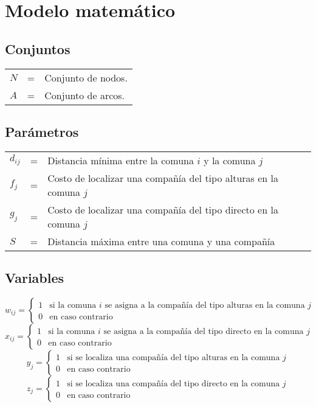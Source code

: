 \documentclass[final]{article}
\numberwithin{equation}{subsection}
\begin{document}
\section{Modelo matemático}
\subsection{Conjuntos}
\begin{tabular}{l r l}
$N$ &=& Conjunto de nodos. \\
$A$ &=& Conjunto de arcos.\\
\end{tabular}

\subsection{Parámetros}
\begin{tabular}{l r l}
$d_{ij}$ &=& Distancia mínima entre la comuna $i$ y la comuna $j$\\
$f_{j}$ &=& Costo de localizar una compañía del tipo alturas en la comuna $j$\\
$g_{j}$ &=& Costo de localizar una compañía del tipo directo en la comuna $j$\\
$S$ &=& Distancia máxima entre una comuna y una compañía\\
\end{tabular}
\subsection{Variables}
\[w_{ij}={\begin{cases}
			1&{\mbox{si la comuna $i$ se asigna a la compañía del tipo alturas en la comuna $j$}}\\
			0&{\mbox{en caso contrario}}\end{cases}}\]
\[x_{ij}={\begin{cases}
			1&{\mbox{si la comuna $i$ se asigna a la compañía del tipo directo en la comuna $j$}}\\
			0&{\mbox{en caso contrario}}\end{cases}}\]
\[y_{j}={\begin{cases}
			1&{\mbox{si se localiza una compañía del tipo alturas en la comuna $j$}}\\
			0&{\mbox{en caso contrario}}\end{cases}}\]
\[z_{j}={\begin{cases}
			1&{\mbox{si se localiza una compañía del tipo directo en la comuna $j$}}\\
			0&{\mbox{en caso contrario}}\end{cases}}\]
\newpage
\end{document}
